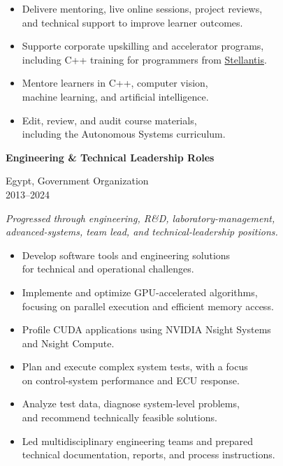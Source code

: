\documentclass[10pt]{article}
\newenvironment{innerlist}[1][\enskip\textbullet]%
        {\begin{itemize}[#1,leftmargin=*,parsep=0pt,itemsep=0pt,topsep=0pt,partopsep=0pt]}
        {\end{itemize}}
\newcommand{\cvroleheader}[3]{%
  \noindent\begin{minipage}[t]{0.59\textwidth}\raggedright\textbf{#1}\end{minipage}\hfill%
  \begin{minipage}[t]{0.39\textwidth}\raggedleft #2\\#3\end{minipage}\par}
\begin{document}
\begin{innerlist}

    \item Delivere mentoring, live online sessions, project reviews,\\ 
     and technical support to improve learner outcomes.

    \item Supporte corporate upskilling and accelerator programs,\\
    including C++ training for programmers from \href{https://www.stellantis.com/en}{Stellantis}.

    \item Mentore learners in C++, computer vision,\\
    machine learning, and artificial intelligence.

    \item Edit, review, and audit course materials,\\
    including the Autonomous Systems curriculum.

\end{innerlist}

\vspace{.05in}

\cvroleheader
        {Engineering \& Technical Leadership Roles}
        {Egypt, Government Organization}
        {2013--2024}

\textit{Progressed through engineering, R\&D, laboratory-management,\\
advanced-systems, team lead, and technical-leadership positions.}

\begin{innerlist}

    \item Develop software tools and engineering solutions\\
    for technical and operational challenges.
    
    \item Implemente and optimize GPU-accelerated algorithms,\\
    focusing on parallel execution and efficient memory access.

    \item Profile CUDA applications using NVIDIA Nsight Systems\\
    and Nsight Compute.

    \item Plan and execute complex system tests, with a focus\\
    on control-system performance and ECU response.

    \item Analyze test data, diagnose system-level problems,\\
    and recommend technically feasible solutions.

    \item Led multidisciplinary engineering teams and prepared\\
    technical documentation, reports, and process instructions.

\end{innerlist}
\end{document}
